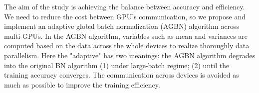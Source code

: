





The aim of the study is achieving the balance between accuracy and efficiency. We need to reduce the cost between GPU's communication, so we propose and implement an adaptive global batch normalization (AGBN) algorithm across multi-GPUs. In the AGBN algorithm, variables such as mean and variances are computed based on the data across the whole devices to realize thoroughly data parallelism. Here the "adaptive" has two meanings: the AGBN algorithm degrades into the original BN algorithm (1) under large-batch regime; (2) until the training accuracy converges. The communication across devices is avoided as much as possible to improve the training efficiency.

